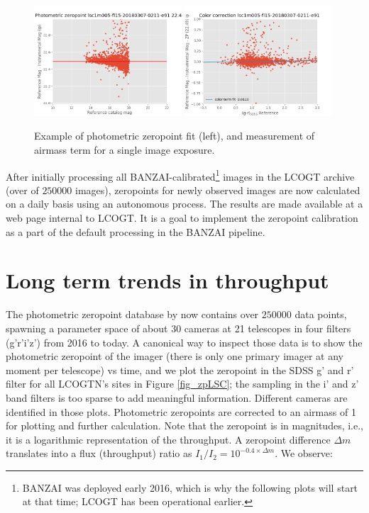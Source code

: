 \documentclass[]{spieman}
\begin{document}
\begin{figure}
\centering
\includegraphics[width=0.49\textwidth]{images/example_zeropointfit.png} \hspace*{\fill}
\includegraphics[width=0.49\textwidth]{images/example_colortermfit.png} \\[1ex]
\caption{\label{fig_singleimageexample}Example of photometric zeropoint fit (left), and measurement of
airmass term for a single image exposure.}
\end{figure}

After initially processing all BANZAI-calibrated\footnote{BANZAI was deployed early 2016, which 
is why the following plots will start at that time; LCOGT has been operational earlier.} images 
in the LCOGT archive (over of $250000$ images), zeropoints for newly observed  images are now 
calculated on a daily basis using an autonomous process. The results  
are made available at a web page internal to LCOGT. It is a goal to implement the zeropoint 
calibration as a part of the default processing in the BANZAI pipeline.


\section{Long term trends in throughput}

The photometric zeropoint database by now contains over $250000$ data points, spawning a parameter
space of about 30 cameras at 21 telescopes in four filters (g'r'i'z') from 2016 to today. A
canonical way to inspect those data is to show the photometric zeropoint of the imager (there is
only one primary imager at any moment per telescope) vs time, and we plot the zeropoint in the SDSS
g' and r' filter for all LCOGTN's sites in Figure \ref{fig_zpLSC}; the sampling in the i' and z'
band filters is too sparse to add meaningful information. Different cameras are identified in those
plots. Photometric zeropoints are corrected to an airmass of 1 for plotting and further calculation.
Note that the zeropoint is in magnitudes, i.e., it is a logarithmic representation of the
throughput. A zeropoint difference $\Delta m$ translates into a flux (throughput) ratio as $I_1 /
I_2 = 10^{-0.4 \times \Delta m}$.  We observe:
\end{document}
